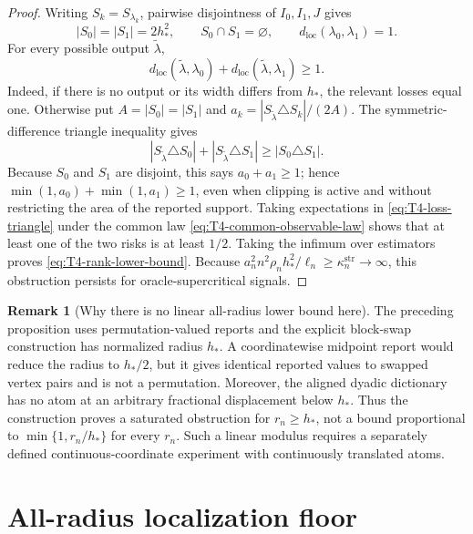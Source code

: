 \documentclass[11pt]{article}
\theoremstyle{definition}
\newtheorem{remark}[definition]{Remark}
\newcommand{\1}{\mathbf 1}\newcommand{\op}{\operatorname}
\begin{document}
\begin{proof}
Writing $S_k=S_{\lambda_k}$, pairwise disjointness of
$I_0,I_1,J$ gives
\[
 |S_0|=|S_1|=2h_*^2,\qquad S_0\cap S_1=\varnothing,
 \qquad d_{\mathrm{loc}}(\lambda_0,\lambda_1)=1.
\]
For every possible output $\widetilde\lambda$,
\begin{equation}
 d_{\mathrm{loc}}(\widetilde\lambda,\lambda_0)
 +d_{\mathrm{loc}}(\widetilde\lambda,\lambda_1)\ge1.
 \label{eq:T4-loss-triangle}
\end{equation}
Indeed, if there is no output or its width differs from $h_*$, the
relevant losses equal one.  Otherwise put $A=|S_0|=|S_1|$ and
$a_k=|S_{\widetilde\lambda}\triangle S_k|/(2A)$.  The
symmetric-difference triangle inequality gives
\[
 |S_{\widetilde\lambda}\triangle S_0|
 +|S_{\widetilde\lambda}\triangle S_1|
 \ge|S_0\triangle S_1|.
\]
Because $S_0$ and $S_1$ are disjoint, this says $a_0+a_1\ge1$;
hence $\min(1,a_0)+\min(1,a_1)\ge1$, even when clipping is active and
without restricting the area of the reported support.
Taking expectations in \eqref{eq:T4-loss-triangle} under the common
law \eqref{eq:T4-common-observable-law} shows that at least one of
the two risks is at least $1/2$.  Taking the infimum over estimators
proves \eqref{eq:T4-rank-lower-bound}.  Because
$a_n^2n^2\rho_nh_*^2/\ell_n
\ge\kappa_n^{\mathrm{str}}\to\infty$, this obstruction
persists for oracle-supercritical signals.
\end{proof}

\begin{remark}[Why there is no linear all-radius lower bound here]
The preceding proposition uses permutation-valued reports
and the explicit block-swap construction has normalized radius $h_*$.  A
coordinatewise midpoint report would reduce the radius to $h_*/2$, but
it gives identical reported values to swapped vertex pairs and is not
a permutation.
Moreover, the aligned dyadic dictionary has no atom at an arbitrary
fractional displacement below $h_*$.  Thus the construction proves a
saturated obstruction for $r_n\ge h_*$, not a bound proportional to
$\min\{1,r_n/h_*\}$ for every $r_n$.  Such a linear modulus requires
a separately defined continuous-coordinate experiment with
continuously translated atoms.
\end{remark}



\section{All-radius localization floor}\label{sec:supp-floor}
\end{document}
